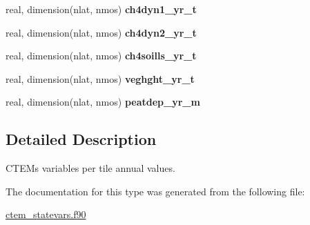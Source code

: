 \begin{DoxyCompactItemize}
\item 
\hypertarget{structctem__statevars_1_1ctem__tileavg__annual_a16a3d0604144a08410f1e1d16449e548}{}real, dimension(nlat, nmos) {\bfseries ch4dyn1\+\_\+yr\+\_\+t}\label{structctem__statevars_1_1ctem__tileavg__annual_a16a3d0604144a08410f1e1d16449e548}

\item 
\hypertarget{structctem__statevars_1_1ctem__tileavg__annual_ae1705c34b1db3514449a1b3b0f6ad0b2}{}real, dimension(nlat, nmos) {\bfseries ch4dyn2\+\_\+yr\+\_\+t}\label{structctem__statevars_1_1ctem__tileavg__annual_ae1705c34b1db3514449a1b3b0f6ad0b2}

\item 
\hypertarget{structctem__statevars_1_1ctem__tileavg__annual_ab67d092e8b427e22886fa04fc552cfde}{}real, dimension(nlat, nmos) {\bfseries ch4soills\+\_\+yr\+\_\+t}\label{structctem__statevars_1_1ctem__tileavg__annual_ab67d092e8b427e22886fa04fc552cfde}

\item 
\hypertarget{structctem__statevars_1_1ctem__tileavg__annual_ae2944baabbe643406d14e8b72ea34708}{}real, dimension(nlat, nmos) {\bfseries veghght\+\_\+yr\+\_\+t}\label{structctem__statevars_1_1ctem__tileavg__annual_ae2944baabbe643406d14e8b72ea34708}

\item 
\hypertarget{structctem__statevars_1_1ctem__tileavg__annual_aea15f7946135667b6b8f1df72717c057}{}real, dimension(nlat, nmos) {\bfseries peatdep\+\_\+yr\+\_\+m}\label{structctem__statevars_1_1ctem__tileavg__annual_aea15f7946135667b6b8f1df72717c057}

\end{DoxyCompactItemize}


\subsection{Detailed Description}
C\+T\+E\+M\textquotesingle{}s variables per tile annual values. 

The documentation for this type was generated from the following file\+:\begin{DoxyCompactItemize}
\item 
\hyperlink{ctem__statevars_8f90}{ctem\+\_\+statevars.\+f90}\end{DoxyCompactItemize}
